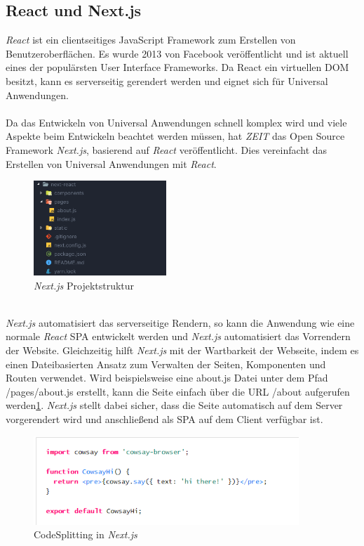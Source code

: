 \documentclass[runningheads]{llncs}
\begin{document}
\subsection{React und Next.js}
\label{subsec:React und Next.js}
\textit{React} ist ein clientseitiges JavaScript Framework zum Erstellen von Benutzeroberflächen. 
Es wurde 2013 von Facebook veröffentlicht und ist aktuell eines der populärsten User Interface Frameworks. 
Da React ein virtuellen DOM besitzt, 
kann es serverseitig gerendert werden und eignet sich für Universal Anwendungen.
\\
\\
Da das Entwickeln von Universal Anwendungen schnell komplex wird und 
viele Aspekte beim Entwickeln beachtet werden müssen, 
hat \textit{ZEIT} das Open Source Framework \textit{Next.js}, 
basierend auf \textit{React} veröffentlicht. 
Dies vereinfacht das Erstellen von Universal Anwendungen mit \textit{React}.
\begin{figure}
  \centering
  \includegraphics[width=5cm]{images/nextprojectStructure}
  \caption{\textit{Next.js} Projektstruktur\cite{arunoda}}
  \label{Next.js Projektstruktur}
\end{figure}
\\
\textit{Next.js} automatisiert das serverseitige Rendern, 
so kann die Anwendung wie eine normale \textit{React} SPA entwickelt werden und 
\textit{Next.js} automatisiert das Vorrendern der Website. 
Gleichzeitig hilft \textit{Next.js} mit der Wartbarkeit der Webseite, 
indem es einen Dateibasierten Ansatz zum Verwalten der Seiten, 
Komponenten und Routen verwendet. 
Wird beispielsweise eine about.js Datei unter dem Pfad /pages/about.js erstellt, 
kann die Seite einfach über die URL /about aufgerufen werden\ref{Next.js Projektstruktur}. 
\textit{Next.js} stellt dabei sicher, 
dass die Seite automatisch auf dem Server vorgerendert wird und 
anschließend als SPA auf dem Client verfügbar ist. 
\begin{figure}
  \centering
  \includegraphics[width=10cm]{images/CodeSplitting}
  \caption{CodeSplitting in \textit{Next.js} \cite{arunoda}}
  \label{CodeSplitting in Next.js}
\end{figure}
\end{document}
